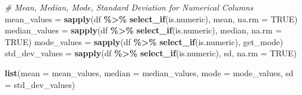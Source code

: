 \documentclass[
]{article}
\newenvironment{Shaded}{\begin{snugshade}}{\end{snugshade}}
\newcommand{\AttributeTok}[1]{\textcolor[rgb]{0.13,0.29,0.53}{#1}}
\newcommand{\CommentTok}[1]{\textcolor[rgb]{0.56,0.35,0.01}{\textit{#1}}}
\newcommand{\ConstantTok}[1]{\textcolor[rgb]{0.56,0.35,0.01}{#1}}
\newcommand{\FunctionTok}[1]{\textcolor[rgb]{0.13,0.29,0.53}{\textbf{#1}}}
\newcommand{\NormalTok}[1]{#1}
\newcommand{\OtherTok}[1]{\textcolor[rgb]{0.56,0.35,0.01}{#1}}
\newcommand{\SpecialCharTok}[1]{\textcolor[rgb]{0.81,0.36,0.00}{\textbf{#1}}}
\begin{document}
\begin{Shaded}
\begin{Highlighting}[]
\CommentTok{\# Mean, Median, Mode, Standard Deviation for Numerical Columns}
\NormalTok{mean\_values }\OtherTok{=} \FunctionTok{sapply}\NormalTok{(df }\SpecialCharTok{\%\textgreater{}\%} \FunctionTok{select\_if}\NormalTok{(is.numeric), mean, }\AttributeTok{na.rm =} \ConstantTok{TRUE}\NormalTok{)}
\NormalTok{median\_values }\OtherTok{=} \FunctionTok{sapply}\NormalTok{(df }\SpecialCharTok{\%\textgreater{}\%} \FunctionTok{select\_if}\NormalTok{(is.numeric), median, }\AttributeTok{na.rm =} \ConstantTok{TRUE}\NormalTok{)}
\NormalTok{mode\_values }\OtherTok{=} \FunctionTok{sapply}\NormalTok{(df }\SpecialCharTok{\%\textgreater{}\%} \FunctionTok{select\_if}\NormalTok{(is.numeric), get\_mode)}
\NormalTok{std\_dev\_values }\OtherTok{=} \FunctionTok{sapply}\NormalTok{(df }\SpecialCharTok{\%\textgreater{}\%} \FunctionTok{select\_if}\NormalTok{(is.numeric), sd, }\AttributeTok{na.rm =} \ConstantTok{TRUE}\NormalTok{)}

\FunctionTok{list}\NormalTok{(}\AttributeTok{mean =}\NormalTok{ mean\_values, }\AttributeTok{median =}\NormalTok{ median\_values, }\AttributeTok{mode =}\NormalTok{ mode\_values, }\AttributeTok{sd =}\NormalTok{ std\_dev\_values)}
\end{Highlighting}
\end{Shaded}
\end{document}
